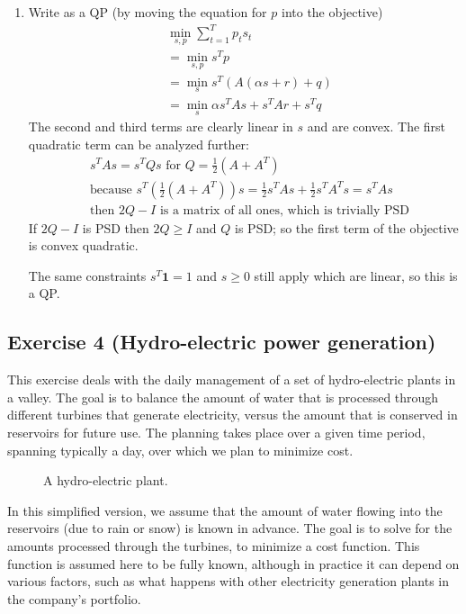 \documentclass[11pt]{article}
\begin{document}
\begin{solution}
\begin{enumerate}
    \item Write as a QP (by moving the equation for $p$ into the objective)
    \begin{align*}
        &\min_{s,p} \sum_{t=1}^T p_t s_t \\
        &=\min_{s,p} s^T p \\
        &=\min_{s} s^T (A(\alpha s + r) + q) \\
        &=\min_{s} \alpha s^T A s + s^T A r + s^T q
    \end{align*}
    The second and third terms are clearly linear in $s$ and are convex. The first quadratic term can be analyzed further:
    \begin{align*}
        &s^T A s = s^T Q s \text{ for } Q = \frac{1}{2} (A + A^T) \\
        &\text{because } s^T (\frac{1}{2} (A + A^T)) s = \frac{1}{2} s^T A s + \frac{1}{2} s^T A^T s = s^T A s \\
        &\text{then } 2Q - I \text{ is a matrix of all ones, which is trivially PSD}
    \end{align*}
    If $2Q - I$ is PSD then $2Q \geq I$ and $Q$ is PSD; so the first term of the objective is convex quadratic.

    The same constraints $s^T \mathbf{1} = 1$ and $s \geq 0$ still apply which are linear, so this is a QP.
\end{enumerate}
\end{solution}

\newpage
\subsection*{Exercise 4 (Hydro-electric power generation)}

This exercise deals with the daily management of a set of hydro-electric plants in a valley. The goal is to balance the amount of water that is processed through different turbines that generate electricity, versus the amount that is conserved in reservoirs for future use. The planning takes place over a given time period, spanning typically a day, over which we plan to minimize cost.

\begin{figure}[h!]
\begin{center}
\caption{A hydro-electric plant.}
\end{center}
\end{figure}

In this simplified version, we assume that the amount of water flowing into the reservoirs (due to rain or snow) is known in advance. The goal is to solve for the amounts processed through the turbines, to minimize a cost function. This function is assumed here to be fully known, although in practice it can depend on various factors, such as what happens with other electricity generation plants in the company's portfolio.
\end{document}
